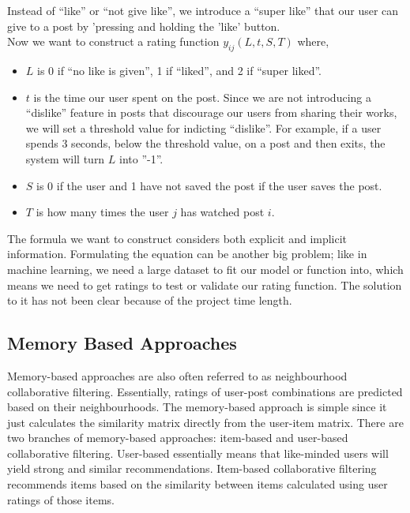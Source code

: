 Instead of “like” or “not give like”, we introduce a “super like” that our user can give to a post by 'pressing and holding the 'like' button.
\\Now we want to construct a rating function $y_{ij}(L,t,S,T)$ where, 
\begin{itemize}
\item$L$ is 0 if “no like is given”, 1 if “liked”, and 2 if “super liked”.
\item$t$ is the time our user spent on the post. Since we are not introducing a “dislike” feature in posts that discourage our users from sharing their works, we will set a threshold value for indicting “dislike”. For example, if a user spends 3 seconds, below the threshold value, on a post and then exits, the system will turn $L$ into ”-1”.
\item$S$ is 0 if the user and 1 have not saved the post if the user saves the post.
\item$T$ is how many times the user $j$ has watched post $i$.
\end{itemize}
The formula we want to construct considers both explicit and implicit information. Formulating the equation can be another big problem; like in machine learning, we need a large dataset to fit our model or function into, which means we need to get ratings to test or validate our rating function. The solution to it has not been clear because of the project time length.

\subsection{Memory Based Approaches}
Memory-based approaches are also often referred to as neighbourhood collaborative filtering. Essentially, ratings of user-post combinations are predicted based on their neighbourhoods. The memory-based approach is simple since it just calculates the similarity matrix directly from the user-item matrix. There are two branches of memory-based approaches: item-based and user-based collaborative filtering. User-based essentially means that like-minded users will yield strong and similar recommendations. Item-based collaborative filtering recommends items based on the similarity between items calculated using user ratings of those items.
